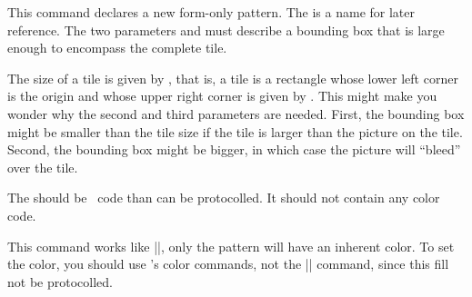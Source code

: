 \begin{command}{\pgfdeclarepatternformonly%
    }
  This command declares a new form-only pattern. The  is a
  name for later reference. The two parameters  and
   must describe a bounding box that is large enough
  to encompass the complete tile.

  The size of a tile is given by , that is, a tile is
  a rectangle whose lower left   corner is the origin and whose upper
  right corner is given by . This might make you
  wonder why the second and third parameters are needed. First, the
  bounding box might be smaller than the tile size if the tile is
  larger than the picture on the tile. Second, the bounding box might
  be bigger, in which case the picture will ``bleed'' over the tile.

  The  should be \pgfname\ code than can be protocolled. It
  should not contain any color code.

  
\begin{codeexample}[]
{\pgfpointorigin}{\pgfpoint{1cm}{1cm}}
{\pgfpoint{1cm}{1cm}}
{
  \pgftransformshift{\pgfpoint{.5cm}{.5cm}}
  \pgfpathclose%
}
\end{codeexample}
\end{command}

\begin{command}{\pgfdeclarepatterninherentlycolored
    }
  This command works like |\pgfdeclarepatternuncolored|, only the
  pattern will have an inherent color. To set the color, you should
  use \pgfname's color commands, not the |\color| command, since this
  fill not be protocolled.
  
\begin{codeexample}[]
{\pgfpointorigin}{\pgfpoint{1cm}{1cm}}
{\pgfpoint{1cm}{1cm}}
{
  \pgftransformshift{\pgfpoint{.5cm}{.5cm}}
  \pgfpathclose%
}
\end{codeexample}
\end{command}


